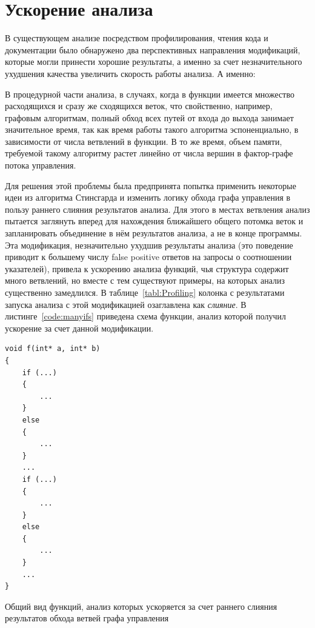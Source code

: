 \section{Ускорение анализа}

В существующем анализе посредством профилирования, чтения кода и документации было обнаружено два перспективных направления модификаций, которые могли принести хорошие результаты, а именно за счет незначительного ухудшения качества увеличить скорость работы анализа. 
А именно: %

В процедурной части анализа, в случаях, когда в функции имеется множество расходящихся и сразу же сходящихся веток, что свойственно, например, графовым алгоритмам, полный обход всех путей от входа до выхода занимает значительное время, так как время работы такого алгоритма эспоненциально, в зависимости от числа ветвлений в функции. В то же время, объем памяти, требуемой такому алгоритму растет линейно от числа вершин в фактор-графе потока управления.

Для решения этой проблемы была предпринята попытка применить некоторые идеи из алгоритма Стинсгарда и изменить логику обхода графа управления в пользу раннего слияния результатов анализа. Для этого в местах ветвления анализ пытается заглянуть вперед для нахождения ближайшего общего потомка веток и запланировать объединение в нём результатов анализа, а не в конце программы. Эта модификация, незначительно ухудшив результаты анализа (это поведение приводит к большему числу false positive ответов на запросы о соотношении указателей), привела к ускорению анализа функций, чья структура содержит много ветвлений, но вместе с тем существуют примеры, на которых анализ существенно замедлился. В таблице~\ref{tabl:Profiling} колонка с результатами запуска анализа с этой модификацией озаглавлена как \textit{слияние}. В листинге~\ref{code:manyifs} приведена схема функции, анализ которой получил ускорение за счет данной модификации.

\begin{ListingEnv}[ht]
\begin{lstlisting}
void f(int* a, int* b)
{
    if (...)
    {
        ...
    }
    else
    {
        ...
    }
    ...
    if (...)
    {
        ...
    }
    else
    {
        ...
    }
    ...
}
\end{lstlisting}
\caption{Общий вид функций, анализ которых ускоряется за счет раннего слияния результатов обхода ветвей графа управления}
\label{code:manyifs}
\end{ListingEnv}

